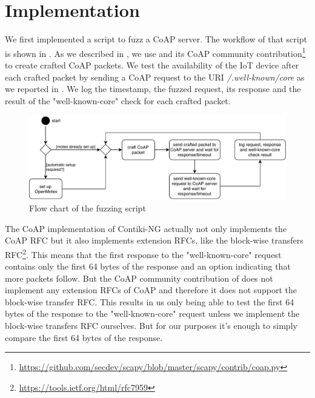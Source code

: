 \section{Implementation}
\label{section:implementation}


We first implemented a script to fuzz a CoAP server. The workflow of that script is shown in . As we described in , we use \scapy and its CoAP community contribution\footnote{\url{https://github.com/secdev/scapy/blob/master/scapy/contrib/coap.py}} to create crafted CoAP packets. We test the availability of the IoT device after each crafted packet by sending a CoAP request to the URI \textit{/.well-known/core} as we reported in . We log the timestamp, the fuzzed request, its response and the result of the "well-known-core" check for each crafted packet.

\begin{figure}
	\centering
	\includegraphics[width=\textwidth]{images/fuzzing_flow_chart}
	\caption{Flow chart of the fuzzing script}
	\label{figure:fuzz_flow_chart}
\end{figure}

The CoAP implementation of Contiki-NG actually not only implements the CoAP RFC but it also implements extension RFCs, like the block-wise transfers RFC\footnote{\url{https://tools.ietf.org/html/rfc7959}}. This means that the first response to the "well-known-core" request contains only the first 64 bytes of the response and an option indicating that more packets follow. But the CoAP community contribution of \scapy does not implement any extension RFCs of CoAP and therefore it does not support the block-wise transfer RFC. This results in us only being able to test the first 64 bytes of the response to the "well-known-core" request unless we implement the block-wise transfers RFC ourselves. But for our purposes it's enough to simply compare the first 64 bytes of the response.

